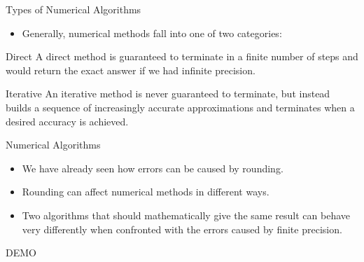 \documentclass[serif,xcolor=pdftex,dvipsnames,table,hyperref={bookmarks=false,breaklinks}]{beamer}
\begin{document}
\begin{frame}[t]{Long Division}
	\centering
    \texttt{[image: \{../Figures/long\_division]}.png}
\end{frame}
	
\begin{frame}[t]{Types of Numerical Algorithms}
	\begin{itemize}[<+->]
		\item Generally, numerical methods fall into one of two categories:
	\end{itemize}
	
	\pause
	\begin{block}{Direct}
		A direct method is guaranteed to terminate in a finite number of steps and would return the exact answer if we had infinite precision.
	\end{block}
	
	\pause
	\begin{block}{Iterative}
		An iterative method is never guaranteed to terminate, but instead builds a sequence of increasingly accurate approximations and terminates when a desired accuracy is achieved.
	\end{block}
	
\end{frame}

\begin{frame}{Numerical Algorithms}
	\begin{itemize}[<+->]
		\item We have already seen how errors can be caused by rounding. 
		\item Rounding can affect numerical methods in different ways.
		\item Two algorithms that should mathematically give the same result can behave very differently when confronted with the errors caused by finite precision.
	\end{itemize}
	
	\pause
	\centering
	\Huge{DEMO}
\end{frame}
\end{document}
